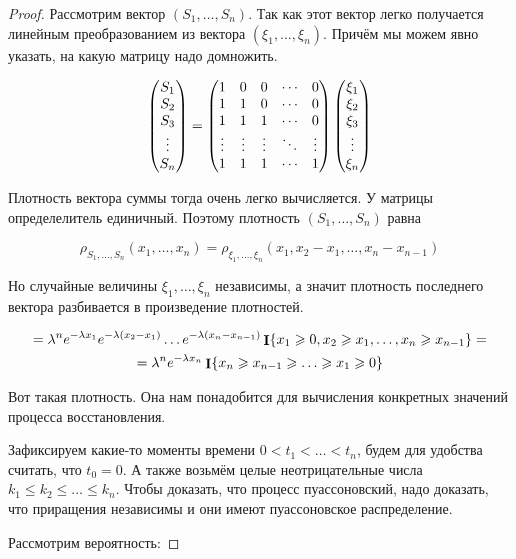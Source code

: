 \begin{proof}
  Рассмотрим вектор $(S_1, \ldots, S_n)$. Так как этот вектор 
  легко получается линейным преобразованием из вектора $(\xi_1, \ldots, \xi_n)$.
  Причём мы можем явно указать, на какую матрицу надо домножить.

  \[
    \begin{pmatrix}
      S_1 \cr 
      S_2 \cr 
      S_3 \cr 
      \vdots \cr 
      S_n
    \end{pmatrix}
    =
    \begin{pmatrix}
      1 & 0 & 0 & \cdots & 0 \cr 
      1 & 1 & 0 & \cdots & 0 \cr
      1 & 1 & 1 & \cdots & 0 \cr
      \vdots & \vdots & \vdots & \ddots & \vdots \cr 
      1 & 1 & 1 & \cdots & 1
    \end{pmatrix}
    \begin{pmatrix}
      \xi_1 \cr 
      \xi_2 \cr 
      \xi_3 \cr 
      \vdots \cr 
      \xi_n
    \end{pmatrix}
  \]

  Плотность вектора суммы тогда очень легко вычисляется. У матрицы
  определелитель единичный. Поэтому плотность $(S_1, \ldots, S_n)$ равна

  \[
    \rho_{S_1, \ldots, S_n}(x_1, \ldots, x_n) = 
    \rho_{\xi_1, \ldots, \xi_n}(x_1, x_2 - x_1, \ldots, x_n - x_{n - 1})
  \]

  Но случайные величины $\xi_1, \ldots, \xi_n$ независимы, а значит плотность
  последнего вектора разбивается в произведение плотностей.

  \begin{multline}
    = \lambda^n e^{-\lambda x_1} e^{-\lambda (x_2 - x_1)} \ldots e^{-\lambda(x_n - 
    x_{n - 1})} \mathop{\mathbf{I}}\{x_1 \geqslant 0, x_2 \geqslant x_1, \ldots, x_n \geqslant x_{n - 1}\} =\\=
    \lambda^n e^{-\lambda x_n} \mathop{\mathbf{I}}\{x_n \geqslant x_{n - 1} \geqslant \ldots \geqslant x_1 \geqslant 0\}
  \end{multline}

  Вот такая плотность. Она нам понадобится для вычисления конкретных значений
  процесса восстановления.

  Зафиксируем какие-то моменты времени $0 < t_1 < \ldots < t_n$, будем для
  удобства считать, что $t_0 = 0$. А также возьмём целые неотрицательные числа
  $k_1 \leq k_2 \leq \ldots \leq k_n$. Чтобы доказать, что процесс пуассоновский,
  надо доказать, что приращения независимы и они имеют пуассоновское распределение.

  Рассмотрим вероятность:


\end{proof}
